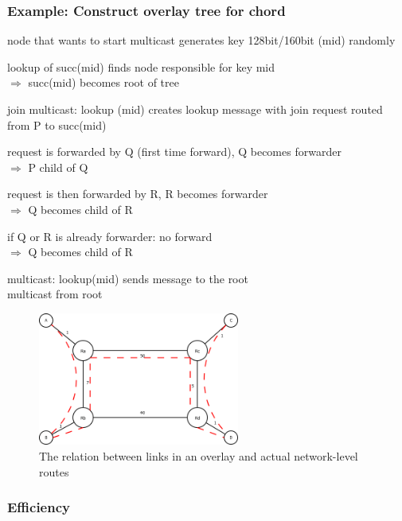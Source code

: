 \documentclass[ngerman,a4paper]{report}
\begin{document}
\subsubsection*{Example: Construct overlay tree for chord}  
\begin{compactitem}
	\item node that wants to start multicast generates key 128bit/160bit (mid) randomly
	\item lookup of succ(mid) finds node responsible for key mid\\
		$\Rightarrow$ succ(mid) becomes root of tree
	\item join multicast: lookup (mid) creates lookup message with join request routed from P to succ(mid)
	\item request is forwarded by Q (first time forward), Q becomes forwarder\\
		$\Rightarrow$ P child of Q
	\item request is then forwarded by R, R becomes forwarder\\
		$\Rightarrow$ Q becomes child of R
	\item if Q or R is already forwarder: no forward\\
		$\Rightarrow$ Q becomes child of R	
	\item multicast: lookup(mid) sends message to the root\\
		multicast from root
\end{compactitem}

\begin{figure}[h]
	\centering
	\includegraphics[width=250px]{gfx/overlay_example.png}
	\caption{The relation between links in an overlay and actual network-level routes}
	\label{img:ovrlnt}
\end{figure}


\subsubsection*{Efficiency}
\end{document}
